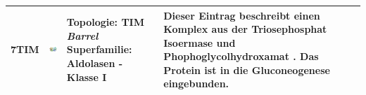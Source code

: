 \documentclass{article}
\begin{document}
\begin{table}
\begin{center}
\begin{tabular}{ | C{9mm} | C{30mm} | C{29mm} | C{38mm} | }
7TIM  & \includegraphics[width=30mm, trim= -10 -5 -5 -10]{7TIM_bio_r_500.jpg} & Topologie: \newline TIM \textit{Barrel} \newline Superfamilie: Aldolasen - Klasse I & Dieser Eintrag beschreibt einen Komplex aus der Triosephosphat Isoermase und Phophoglycolhydroxamat \cite{7tim}. Das Protein ist in die Gluconeogenese eingebunden.\\ 
\hline


\end{tabular}
\end{center}
\end{table}







\end{document}
